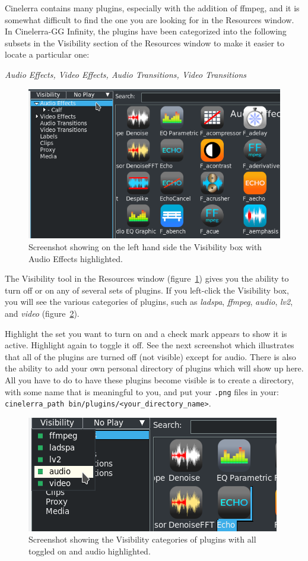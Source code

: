 Cinelerra contains many plugins, especially with the addition of ffmpeg, and it is somewhat difficult to find the one you are looking for in the Resources window. In Cinelerra-GG Infinity, the plugins have been categorized into the following subsets in the Visibility section of the Resources window to make it easier to locate a particular one:

\textit{Audio Effects, \quad Video Effects, \quad Audio Transitions, \quad Video Transitions}

\begin{figure}[htpb]
    \centering
    \includegraphics[width=0.8\linewidth]{images/visibility01.png}
    \caption{Screenshot showing on the left hand side the Visibility box with Audio Effects highlighted.}
    \label{fig:visibility01}
\end{figure}

The Visibility tool in the Resources window (figure~\ref{fig:visibility01}) gives you the ability to turn off or on any of several sets of plugins. If you left-click the Visibility box, you will see the various categories of plugins, such as \textit{ladspa}, \textit{ffmpeg}, \textit{audio}, \textit{lv2}, and \textit{video} (figure~\ref{fig:visibility02}).

Highlight the set you want to turn on and a check mark appears to show it is active. Highlight again to toggle it off. See the next screenshot which illustrates that all of the plugins are turned off (not visible) except for audio. There is also the ability to add your own personal directory of plugins which will show up here. All you have to do to have these plugins become visible is to create a directory, with some name that is meaningful to you, and put your \texttt{.png} files in your: \\
\texttt{cinelerra\_path bin/plugins/<your\_directory\_name>}.

\begin{figure}[htpb]
    \centering
    \includegraphics[width=0.7\linewidth]{images/visibility02.png}
    \caption{Screenshot showing the Visibility categories of plugins with all toggled on and audio highlighted.}
    \label{fig:visibility02}
\end{figure}

